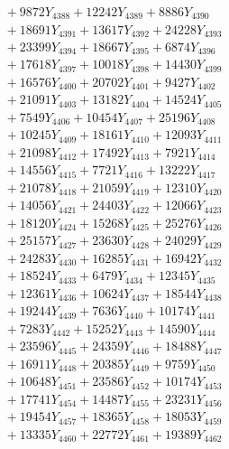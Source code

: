 \documentclass[a4paper,10pt]{article}
\begin{document}
{\begin{align}
&\;  + 9872 Y_{4388} + 12242 Y_{4389} + 8886 Y_{4390} \\[0.3ex]
&\;  + 18691 Y_{4391} + 13617 Y_{4392} + 24228 Y_{4393} \\[0.3ex]
&\;  + 23399 Y_{4394} + 18667 Y_{4395} + 6874 Y_{4396} \\[0.3ex]
&\;  + 17618 Y_{4397} + 10018 Y_{4398} + 14430 Y_{4399} \\[0.3ex]
&\;  + 16576 Y_{4400} + 20702 Y_{4401} + 9427 Y_{4402} \\[0.3ex]
&\;  + 21091 Y_{4403} + 13182 Y_{4404} + 14524 Y_{4405} \\[0.3ex]
&\;  + 7549 Y_{4406} + 10454 Y_{4407} + 25196 Y_{4408} \\[0.5ex]\allowbreak
&\;  + 10245 Y_{4409} + 18161 Y_{4410} + 12093 Y_{4411} \\[0.3ex]
&\;  + 21098 Y_{4412} + 17492 Y_{4413} + 7921 Y_{4414} \\[0.3ex]
&\;  + 14556 Y_{4415} + 7721 Y_{4416} + 13222 Y_{4417} \\[0.3ex]
&\;  + 21078 Y_{4418} + 21059 Y_{4419} + 12310 Y_{4420} \\[0.3ex]
&\;  + 14056 Y_{4421} + 24403 Y_{4422} + 12066 Y_{4423} \\[0.3ex]
&\;  + 18120 Y_{4424} + 15268 Y_{4425} + 25276 Y_{4426} \\[0.3ex]
&\;  + 25157 Y_{4427} + 23630 Y_{4428} + 24029 Y_{4429} \\[0.3ex]
&\;  + 24283 Y_{4430} + 16285 Y_{4431} + 16942 Y_{4432} \\[0.3ex]
&\;  + 18524 Y_{4433} + 6479 Y_{4434} + 12345 Y_{4435} \\[0.3ex]
&\;  + 12361 Y_{4436} + 10624 Y_{4437} + 18544 Y_{4438} \\[0.5ex]\allowbreak
&\;  + 19244 Y_{4439} + 7636 Y_{4440} + 10174 Y_{4441} \\[0.3ex]
&\;  + 7283 Y_{4442} + 15252 Y_{4443} + 14590 Y_{4444} \\[0.3ex]
&\;  + 23596 Y_{4445} + 24359 Y_{4446} + 18488 Y_{4447} \\[0.3ex]
&\;  + 16911 Y_{4448} + 20385 Y_{4449} + 9759 Y_{4450} \\[0.3ex]
&\;  + 10648 Y_{4451} + 23586 Y_{4452} + 10174 Y_{4453} \\[0.3ex]
&\;  + 17741 Y_{4454} + 14487 Y_{4455} + 23231 Y_{4456} \\[0.3ex]
&\;  + 19454 Y_{4457} + 18365 Y_{4458} + 18053 Y_{4459} \\[0.3ex]
&\;  + 13335 Y_{4460} + 22772 Y_{4461} + 19389 Y_{4462} \\[0.3ex]

\end{align}}
\end{document}
